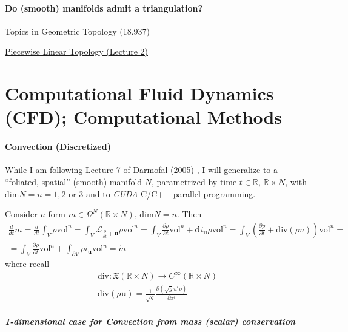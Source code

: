 \documentclass[10pt]{amsart}
\begin{document}
\begin{multicols*}{2}
\subsection{Do (smooth) manifolds admit a triangulation?}

Topics in Geometric Topology (18.937)


\href{http://www.math.harvard.edu/~lurie/937notes/937Lecture2.pdf}{Piecewise Linear Topology (Lecture 2)}

\part{Computational Fluid Dynamics (CFD); Computational Methods} 

\subsection{Convection (Discretized)}

While I am following Lecture 7 of Darmofal (2005) \cite{Darm2005}, I will generalize to a ``foliated, spatial'' (smooth) manifold $N$, parametrized by time $t\in \mathbb{R}$, $\mathbb{R}\times N$, with $\text{dim}N = n = 1,2 \text{ or } 3$ and to \emph{CUDA} C/C++ parallel programming.

Consider $n$-form $m \in \Omega^N(\mathbb{R}\times N)$, $\text{dim}N = n$.  Then
\begin{equation}\label{Eq:massconservation}
  \begin{gathered}
    \frac{d}{dt} m = \frac{d}{dt} \int_V \rho \text{vol}^n = \int_V \mathcal{L}_{\frac{ \partial }{ \partial t} + \mathbf{u} } \rho \text{vol}^n = \int_V \frac{ \partial \rho }{ \partial t} \text{vol}^n + \mathbf{d}i_{\mathbf{u}} \rho \text{vol}^n = \int_V \left( \frac{ \partial \rho }{ \partial t} + \text{div}( \rho u ) \right) \text{vol}^n = \\
    = \int_V \frac{ \partial \rho }{ \partial t} \text{vol}^n + \int_{\partial V} \rho i_{\mathbf{u}} \text{vol}^n = \dot{m}
\end{gathered}
  \end{equation}
where recall
\[
\begin{aligned}
  \text{div} : \mathfrak{X}(\mathbb{R}\times N) \to C^{\infty}(\mathbb{R} \times N ) \\ 
 \text{div}(\rho \mathbf{u} ) = \frac{1}{\sqrt{g}} \frac{ \partial ( \sqrt{g} u^i \rho ) }{ \partial x^i } 
  \end{aligned}
\]

\subsubsection{1-dimensional case for Convection from mass (scalar) conservation}


\end{multicols*}
\end{document}
